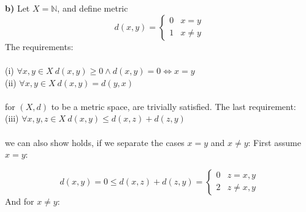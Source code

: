 \documentclass[11pt,a4paper]{report}
\begin{document}
\\
\\
\textbf{b)} Let $X=\mathbb{N}$, and define metric 
\begin{displaymath}
   d(x,y) = \left\{
     \begin{array}{lr}
       0 &  x=y \\
       1 &  x \neq y
     \end{array}
   \right.
\end{displaymath} 
The requirements:
\\
\\
(i) $\forall x,y \in X \ d(x,y)\geq 0 \wedge d(x,y)=0 \iff x=y$ 
\\
(ii) $\forall x,y \in X \ d(x,y)=d(y,x)$
\\
\\
for $(X,d)$ to be a metric space, are trivially satisfied. The last requirement:
\\
(iii) $\forall x,y,z \in X \ d(x,y)\leq d(x,z) + d(z,y)$
\\
\\
we can also show holds, if we separate the cases $x=y$ and $x \neq y$: First assume $x=y$:

\begin{displaymath}
   d(x,y) =0 \leq d(x,z) + d(z,y)=\left\{
     \begin{array}{lr}
       0 &  z=x,y \\
       2 &  z \neq x,y
     \end{array}
   \right.
\end{displaymath} 
And for $x\neq y$:
\end{document}
